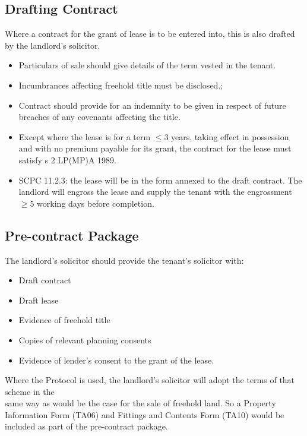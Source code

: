 \documentclass[
]{article}
\providecommand{\tightlist}{%
  \setlength{\itemsep}{0pt}\setlength{\parskip}{0pt}}
\begin{document}
\hypertarget{drafting-contract}{%
\subsection{Drafting Contract}\label{drafting-contract}}

Where a contract for the grant of lease is to be entered into, this is
also drafted by the landlord's solicitor.

\begin{itemize}
\tightlist
\item
  Particulars of sale should give details of the term vested in the
  tenant.
\item
  Incumbrances affecting freehold title must be disclosed.;
\item
  Contract should provide for an indemnity to be given in respect of
  future breaches of any covenants affecting the title.
\item
  Except where the lease is for a term {\(\leq 3\)} years, taking effect
  in possession and with no premium payable for its grant, the contract
  for the lease must satisfy s 2 LP(MP)A 1989.
\item
  SCPC 11.2.3: the lease will be in the form annexed to the draft
  contract. The landlord will engross the lease and supply the tenant
  with the engrossment {\(\geq 5\)} working days before completion.
\end{itemize}

\hypertarget{pre-contract-package}{%
\subsection{Pre-contract Package}\label{pre-contract-package}}

The landlord's solicitor should provide the tenant's solicitor with:

\begin{itemize}
\tightlist
\item
  Draft contract
\item
  Draft lease
\item
  Evidence of freehold title
\item
  Copies of relevant planning consents
\item
  Evidence of lender's consent to the grant of the lease.
\end{itemize}

Where the Protocol is used, the landlord's solicitor will adopt the
terms of that scheme in the\\
same way as would be the case for the sale of freehold land. So a
Property Information Form (TA06) and Fittings and Contents Form (TA10)
would be included as part of the pre-contract package.
\end{document}
